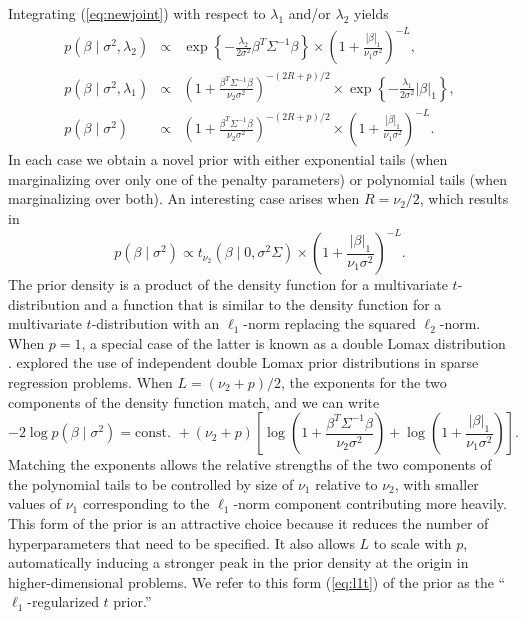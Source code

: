 \documentclass[12pt]{article}
\begin{document}
Integrating (\ref{eq:newjoint}) with respect to $\lambda_1$ and/or $\lambda_2$ yields
\begin{eqnarray*}
	p(\beta \mid \sigma^2, \lambda_2) &\propto& \exp\left\{-\frac{\lambda_2}{2\sigma^2}
		\beta^T \Sigma^{-1}\beta\right\} \times \left(1 + \frac{|\beta|_1}{\nu_1 \sigma^2}
		\right)^{-L}, \\
		p(\beta \mid \sigma^2, \lambda_1) &\propto& \left(1 + \frac{\beta^T \Sigma^{-1}\beta}
		{\nu_2 \sigma^2}\right)^{-(2R + p)/2} \times
	\exp\left\{-\frac{\lambda_1}{2\sigma^2}
		|\beta|_1\right\},  \\
	p(\beta \mid \sigma^2) &\propto& \left(1 + \frac{\beta^T \Sigma^{-1}\beta}
		{\nu_2 \sigma^2}\right)^{-(2R + p)/2} \times \left(1 + \frac{|\beta|_1}
		{\nu_1 \sigma^2}\right)^{-L}.
\end{eqnarray*}
In each case we obtain a novel prior with either exponential tails (when marginalizing over
only one of the penalty parameters) or polynomial tails (when marginalizing over both).
An interesting case arises when $R = \nu_2/2$, which results in
\[
	p(\beta \mid \sigma^2) \propto t_{\nu_2}(\beta \mid 0, \sigma^2 \Sigma) \times
		\left(1 + \frac{|\beta|_1}{\nu_1 \sigma^2}\right)^{-L}.
\]
The prior density is a product of the density function for a multivariate $t$-distribution 
and a function that is similar to the density function for a multivariate $t$-distribution 
with an $\ell_1$-norm replacing the squared $\ell_2$-norm. When $p=1$, a special case of the 
latter is known as a double Lomax distribution \citep{puna:11, puna:15}. \citet{gu:13} explored
the use of independent double Lomax prior distributions in sparse regression problems.
When $L = (\nu_2 + p)/2$, the exponents for the two components of the density function
match, and we can write
\begin{equation}
	-2 \log p(\beta \mid \sigma^2) = \mbox{const. } + (\nu_2 + p)\left[
		\log \left(1 + \frac{\beta^T\Sigma^{-1}\beta}{\nu_2 \sigma^2}\right)
		+ \log \left(1 + \frac{|\beta|_1}{\nu_1 \sigma^2}\right)
		\right]. \label{eq:l1t}
\end{equation}
Matching the exponents allows the relative strengths of the two components of the
polynomial tails to be controlled by size of $\nu_1$ relative to $\nu_2$, with smaller
values of $\nu_1$ corresponding to the $\ell_1$-norm component contributing more heavily.
This form of the prior is an attractive choice because it reduces the number of hyperparameters
that need to be specified. It also allows $L$ to scale with $p$, automatically inducing
a stronger peak in the prior density at the origin in higher-dimensional problems. We
refer to this form (\ref{eq:l1t}) of the prior as the ``$\ell_1$-regularized $t$ prior.''
\end{document}
